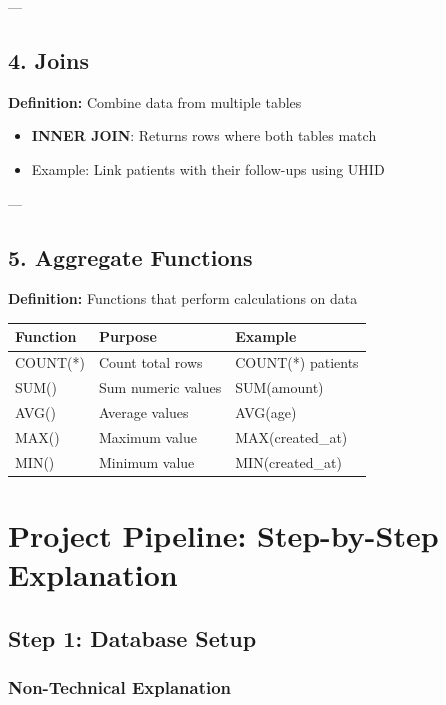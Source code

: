 \documentclass[12pt,a4paper]{article}
\begin{document}
---

\subsection{4. Joins}

\textbf{Definition:} Combine data from multiple tables

\begin{itemize}
    \item \textbf{INNER JOIN}: Returns rows where both tables match
    \item Example: Link patients with their follow-ups using UHID
\end{itemize}

---

\subsection{5. Aggregate Functions}

\textbf{Definition:} Functions that perform calculations on data

\begin{table}[h]
\centering
\begin{tabular}{|l|l|l|}
\hline
\textbf{Function} & \textbf{Purpose} & \textbf{Example} \\
\hline
COUNT(*) & Count total rows & COUNT(*) patients \\
SUM() & Sum numeric values & SUM(amount) \\
AVG() & Average values & AVG(age) \\
MAX() & Maximum value & MAX(created\_at) \\
MIN() & Minimum value & MIN(created\_at) \\
\hline
\end{tabular}
\end{table}

\section{Project Pipeline: Step-by-Step Explanation}

\subsection{Step 1: Database Setup}

\subsubsection{Non-Technical Explanation}
\end{document}
